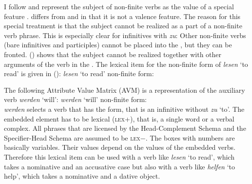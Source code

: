 I follow
\citet[Section~3.1.1]{Kiss95a} and represent the subject of non-finite verbs as the value of a
special feature \subj. \subj differs from \spr and \comps in that it is not a valence feature. The
reason for this special treatment is that the subject cannot be realized as a part of a non-finite
verb phrase. This is especially clear for infinitives with \emph{zu}:
\eal
{}
\zl
Other non-finite verbs (bare infinitives and participles) cannot be placed into the \nf, but they
can be fronted. () shows that the subject cannot be realized together with other arguments
of the verb in the \vf.
\eal
{}
\zl
The lexical item for the non-finite form of \emph{lesen} `to read' is given in ():
\ea
\emph{lesen} `to read' non-finite form:\\
\z

\noindent
The following Attribute Value Matrix (AVM) is a representation of the auxiliary verb \emph{werden} `will':
\eas
\emph{werden} `will' non-finite form:\\
\zs
\emph{werden} selects a verb that has the  form, that is an infinitive without \emph{zu}
`to'. The embedded element has to be lexical (\textsc{lex}+), that is, a single word or a verbal
complex. All phrases that are licensed by the Head-Complement Schema and the Specifier-Head Schema
are assumed to be \textsc{lex}$-$.
The boxes with numbers are basically variables. Their values depend on the values of the
embedded verbs. Therefore this lexical item can be used with a verb like \emph{lesen} `to read',
which takes a nominative and an accusative case but also with a verb like \emph{helfen} `to help',
which takes a nominative and a dative object.

